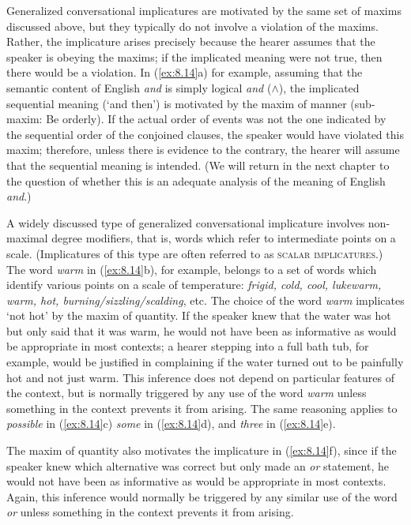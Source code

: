 Generalized conversational implicatures are motivated by the same set of maxims discussed above, but they typically do not involve a violation of the maxims. Rather, the implicature arises precisely because the hearer assumes that the speaker is obeying the maxims; if the implicated meaning were not true, then there would be a violation. In (\ref{ex:8.14}a) for example, assuming that the semantic content of English \textit{and} is simply logical \textit{and} ($\wedge$), the implicated sequential meaning (‘and then’) is motivated by the maxim of manner (sub-maxim: Be orderly). If the actual order of events was not the one indicated by the sequential order of the conjoined clauses, the speaker would have violated this maxim; therefore, unless there is evidence to the contrary, the hearer will assume that the sequential meaning is intended. (We will return in the next chapter to the question of whether this is an adequate analysis of the meaning of English \textit{and}.)



A widely discussed type of generalized conversational implicature involves non-maximal degree modifiers, that is, words which refer to intermediate points on a scale. (Implicatures of this type are often referred to as \textsc{scalar implicatures}.) The word \textit{warm} in (\ref{ex:8.14}b), for example, belongs to a set of words which identify various points on a scale of temperature: \textit{frigid, cold, cool, lukewarm, warm, hot, burning/sizzling/scalding}, etc. The choice of the word \textit{warm} implicates ‘not hot’ by the maxim of quantity. If the speaker knew that the water was hot but only said that it was warm, he would not have been as informative as would be appropriate in most contexts; a hearer stepping into a full bath tub, for example, would be justified in complaining if the water turned out to be painfully hot and not just warm. This inference does not depend on particular features of the context, but is normally triggered by any use of the word \textit{warm} unless something in the context prevents it from arising. The same reasoning applies to \textit{possible} in (\ref{ex:8.14}c) \textit{some} in (\ref{ex:8.14}d), and \textit{three} in (\ref{ex:8.14}e).



The maxim of quantity also motivates the implicature in (\ref{ex:8.14}f), since if the speaker knew which alternative was correct but only made an \textit{or} statement, he would not have been as informative as would be appropriate in most contexts. Again, this inference would normally be triggered by any similar use of the word \textit{or} unless something in the context prevents it from arising.




